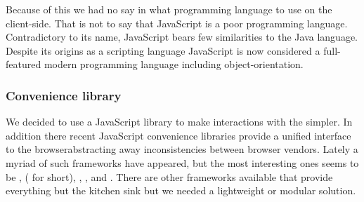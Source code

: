 Because of this we had no say in what programming language to use on the
client-side. That is not to say that JavaScript is a poor programming
language. Contradictory to its name, JavaScript bears few similarities to the
Java language.%
Despite its origins as a scripting language JavaScript is now considered
a full-featured modern programming language
 including object-orientation.

\subsubsection{Convenience library}

We decided to use a JavaScript library to make interactions with the
 simpler.
In addition there recent JavaScript convenience libraries provide a
unified interface to the browser\dash{}abstracting away inconsistencies
between browser vendors. Lately a myriad of such frameworks have appeared,
but the most interesting ones seems to be
,
 ( for short),
,
, and
.%
There are other frameworks available that provide everything but the kitchen
sink but we needed a lightweight or modular solution.

